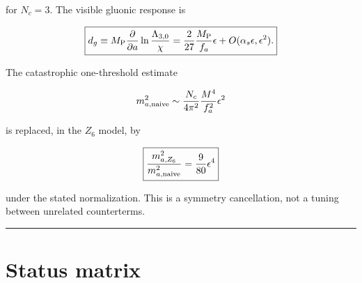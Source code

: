 \documentclass[11pt,a4paper]{article}
\begin{document}
for \(N_c=3\). The visible gluonic response is

\[
\boxed{
 d_g
 \equiv
 M_{\rm P}\frac{\partial}{\partial a}
 \ln\frac{\Lambda_{3,0}}{\chi}
 =
 \frac{2}{27}\frac{M_{\rm P}}{f_a}\epsilon
 +O(\alpha_s\epsilon,\epsilon^2).
}
\]

The catastrophic one-threshold estimate

\[
m_{a,\rm naive}^2
\sim
\frac{N_c}{4\pi^2}
\frac{M^4}{f_a^2}\epsilon^2
\]

is replaced, in the \(Z_6\) model, by

\[
\boxed{
\frac{m_{a,Z_6}^2}{m_{a,\rm naive}^2}
=
\frac{9}{80}\epsilon^4
}
\]

under the stated normalization. This is a symmetry cancellation, not a
tuning between unrelated counterterms.

\begin{center}\rule{0.5\linewidth}{0.5pt}\end{center}

\section{Status matrix}\label{status-matrix}
\end{document}
